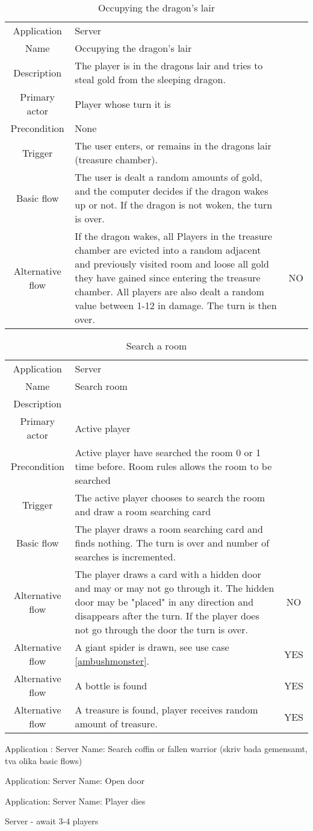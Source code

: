 \documentclass[a4paper,10pt]{report}
\begin{document}
\begin{table}
\caption{Occupying the dragon's lair}
\label{dragonslair}
\begin{tabular}{|c| p{9cm}|c}
\hline
Application &  Server & \\
Name &  Occupying the dragon's lair & \\
Description & The player is in the dragons lair and tries to steal gold from the sleeping dragon. & \\
Primary actor&  Player whose turn it is & \\
Precondition & None & \\
Trigger & The user enters, or remains in the dragons lair (treasure chamber). & \\ \hline
Basic flow & The user is dealt a random amounts of gold, and the computer decides if the dragon wakes up or not. If the dragon is not woken, the turn is over. & \\ \hline
Alternative flow & If the dragon wakes, all Players in the treasure chamber are evicted into a random adjacent and previously visited room and loose all gold they have gained since entering the treasure chamber. All players are also dealt a random value between 1-12 in damage. The turn is then over. & NO \\
\hline
\end{tabular}
\end{table}


\begin{table}
\caption{Search a room}
\label{searchroom}
\begin{tabular}{|c| p{9cm}|c}
\hline
Application & Server & \\
Name & Search room & \\
Description &  & \\
Primary actor & Active player & \\
Precondition & Active player have searched the room 0 or 1 time before. Room rules allows the room to be searched  & \\
Trigger & The active player chooses to search the room and draw a room searching card  & \\ \hline
Basic flow & The player draws a room searching card and finds nothing. The turn is over and number of searches is incremented. & \\ \hline
Alternative flow & The player draws a card with a hidden door and may or may not go through it. The hidden door may be "placed" in any direction and disappears after the turn. If the player does not go through the door the turn is over. & NO \\\hline
Alternative flow & A giant spider is drawn, see use case \ref{ambushmonster}. & YES \\ \hline
Alternative flow & A bottle is found & YES \\ \hline
Alternative flow & A treasure is found, player receives random amount of treasure. & YES \\
\hline
\end{tabular}
\end{table}

Application : Server
Name: Search coffin or fallen warrior (skriv bada gemensamt, tva olika basic flows)

Application: Server
Name: Open door

Application: Server
Name: Player dies


Server - await 3-4 players
\end{document}
